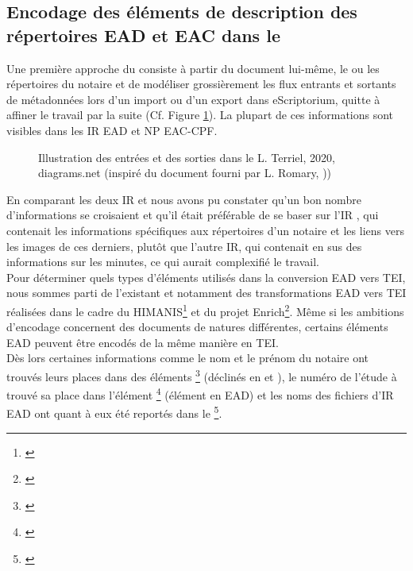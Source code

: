 \subsection{Encodage des éléments de description des répertoires EAD et EAC dans le }

Une première approche du  consiste à partir du document lui-même, le ou les répertoires du notaire et de modéliser grossièrement les flux entrants et sortants de métadonnées lors d'un import ou d'un export dans eScriptorium, quitte à affiner le travail par la suite (Cf. Figure \ref{fig:flux_teiheader}). La plupart de ces informations sont visibles dans les IR EAD et NP EAC-CPF.

\begin{figure}[h]
    \centering
    \centerline{}
    \caption{Illustration des entrées et des sorties dans le  \textcopyright L. Terriel, 2020, diagrams.net (inspiré du document fourni par L. Romary, ))}
    \label{fig:flux_teiheader}
\end{figure}

\newpage
En comparant les deux IR  et  nous avons pu constater qu'un bon nombre d'informations se croisaient et qu'il était préférable de se baser sur l'IR , qui contenait les informations spécifiques aux répertoires d'un notaire et les liens vers les images de ces derniers, plutôt que l'autre IR, qui contenait en sus des informations sur les minutes, ce qui aurait complexifié le travail.\\

Pour déterminer quels types d'éléments utilisés dans la conversion EAD vers TEI, nous sommes parti de l'existant et notamment des transformations EAD vers TEI réalisées dans le cadre du HIMANIS\footnote{\cite{stutzmann_ead-tei_2019}} et du projet Enrich\footnote{\cite{university_of_oxford_-__bodleian_library_ead2enrich_nodate}}. Même si les ambitions d'encodage concernent des documents de natures différentes, certains éléments EAD peuvent être encodés de la même manière en TEI.\\

Dès lors certaines informations comme le nom et le prénom du notaire ont trouvés leurs places dans des éléments \footnote{\cite{tei_tei_nodate-9}} (déclinés en  et ), le numéro de l'étude à trouvé sa place dans l'élément \footnote{\cite{tei_tei_nodate-8}} (élément  en EAD) et les noms des fichiers d'IR EAD ont quant à eux été reportés dans le \footnote{\cite{tei_tei_nodate-7}}.\\

